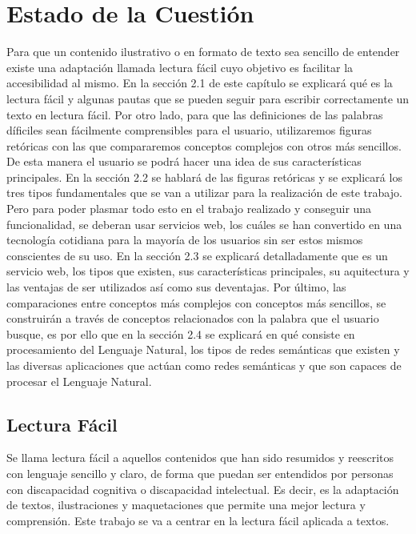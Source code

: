 \chapter{Estado de la Cuestión}
\label{cap:estadoDeLaCuestion}


Para que un contenido ilustrativo o en formato de texto sea sencillo de entender existe una adaptación llamada lectura fácil cuyo objetivo es facilitar la accesibilidad al mismo. En la sección 2.1 de este capítulo se explicará qué es la lectura fácil y algunas pautas que se pueden seguir para escribir correctamente un texto en lectura fácil. Por otro lado, para que las definiciones de las palabras díficiles sean fácilmente comprensibles para el usuario, utilizaremos figuras retóricas con las que compararemos conceptos complejos con otros más sencillos. De esta manera el usuario se podrá hacer una idea de sus características principales. En la sección 2.2 se hablará de las figuras retóricas y se explicará los tres tipos fundamentales que se van a utilizar para la realización de este trabajo. 
Pero para poder plasmar todo esto en el trabajo realizado y conseguir una funcionalidad, se deberan usar servicios web, los cuáles se han convertido en una tecnología cotidiana para la mayoría de los usuarios sin ser estos mismos conscientes de su uso. En la sección 2.3 se explicará detalladamente que es un servicio web, los tipos que existen, sus características principales, su aquitectura y las ventajas de ser utilizados así como sus deventajas. Por último, las comparaciones entre conceptos más complejos con conceptos más sencillos, se construirán a través de conceptos relacionados con la palabra que el usuario busque, es por ello que en la sección 2.4 se explicará en qué consiste en procesamiento del Lenguaje Natural, los tipos de redes semánticas que existen y las diversas aplicaciones que actúan como redes semánticas y que son capaces de procesar el Lenguaje Natural.

\section{Lectura Fácil}
\label{cap:sec:lecturafacil}

Se llama lectura fácil a aquellos contenidos que han sido resumidos y reescritos con lenguaje sencillo y claro, de forma que puedan ser entendidos por personas con discapacidad cognitiva o discapacidad intelectual. Es decir, es la adaptación de textos, ilustraciones y maquetaciones que permite una mejor lectura y comprensión.
Este trabajo se va a centrar en la lectura fácil aplicada a textos.

